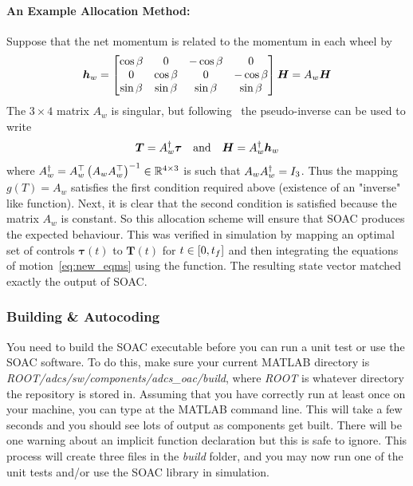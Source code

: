 \documentclass[10pt]{article}
\begin{document}
\paragraph{An Example Allocation Method:} Suppose that the net momentum is related to the momentum in each wheel by
\begin{equation}
\bm{h}_w = \begin{bmatrix}
\cos\beta & 0 & -\cos\beta & 0 \\ 0 & \cos\beta & 0 & -\cos\beta \\ \sin\beta & \sin\beta & \sin\beta & \sin\beta
\end{bmatrix} \bm{H} = A_w \bm{H}
\end{equation}
The $3\times 4$ matrix $A_w$ is singular, but following~\cite[\S 7.3.4]{Sidi1997} the pseudo-inverse can be used to write 
\begin{equation}
\bm{T} = A_w^{\dagger} \bm{\tau} \quad \text{and} \quad \bm{H} = A_w^{\dagger} \bm{h}_w
\end{equation}
where $A_w^{\dagger} = A_w^{\top} \left(A_w A_w^{\top}\right)^{-1} \in {\mathbb{R}}^{4\times 3}$
is such that $A_w A_w^{\dagger} = I_{3}$. Thus the mapping $g(T) = A_w$ satisfies the first condition required above (existence of an "inverse" like function). Next, it is clear that the second condition is satisfied because the matrix $A_w$ is constant. So this allocation scheme will ensure that SOAC produces the expected behaviour. This was verified in simulation by mapping an optimal set of controls $\bm{\tau}(t)$ to $\bm{T}(t)$ for $t\in[0,t_f]$ and then integrating the equations of motion~\eqref{eq:new_eqms} using the  function. The resulting state vector matched exactly the output of SOAC.

\subsubsection{Building \& Autocoding}\label{sec2:build_autocode}

You need to build the SOAC executable before you can run a unit test or use the SOAC software. To do this, make sure your current MATLAB directory is \textit{ROOT/adcs/sw/components/adcs\_oac/build}, where \textit{ROOT} is whatever directory the repository is stored in. Assuming that you have correctly run  at least once on your machine, you can type  at the MATLAB command line. This will take a few seconds and you should see lots of output as components get built. There will be one warning about an implicit function declaration but this is safe to ignore. This process will create three files in the \textit{build} folder, and you may now run one of the unit tests and/or use the SOAC library in simulation.   
\end{document}
